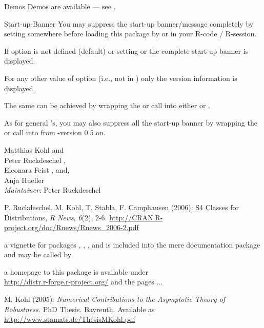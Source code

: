\begin{Section}{Demos}
Demos are available --- see .
\end{Section}
\begin{Section}{Start-up-Banner}
You may suppress the start-up banner/message completely by setting 
 somewhere before loading this package by 
 or  in your R-code / R-session.

If option  is not defined (default) or setting    
 or 
 the complete start-up banner is 
displayed.

For any other value of option  (i.e., not in 
) only the version information is displayed.

The same can be achieved by wrapping the  or   call 
into either  or 
.  

As for general 's, you may also suppress all
the start-up banner by wrapping the  or  
call into  from 
-version 0.5 on.
\end{Section}
\begin{Author}\relax
Matthias Kohl  and \\
Peter Ruckdeschel ,\\ 
Eleonara Feist , and, \\
Anja Hueller \\  

\emph{Maintainer:}  Peter Ruckdeschel 
\end{Author}
\begin{References}\relax
P. Ruckdeschel, M. Kohl, T. Stabla, F. Camphausen (2006):
S4 Classes for Distributions, {\em R News}, {\em 6}(2), 2-6. 
\url{http://CRAN.R-project.org/doc/Rnews/Rnews_2006-2.pdf}


a vignette for packages , , , 
and  is included into the mere documentation package  
and may be called by 

a homepage to this package is available under\\
\url{http://distr.r-forge.r-project.org/} and the pages ...

M. Kohl (2005): \emph{Numerical Contributions to the Asymptotic 
Theory of Robustness.} PhD Thesis. Bayreuth. Available as 
\url{http://www.stamats.de/ThesisMKohl.pdf}
\end{References}
\begin{SeeAlso}\relax
{} 
\end{SeeAlso}

